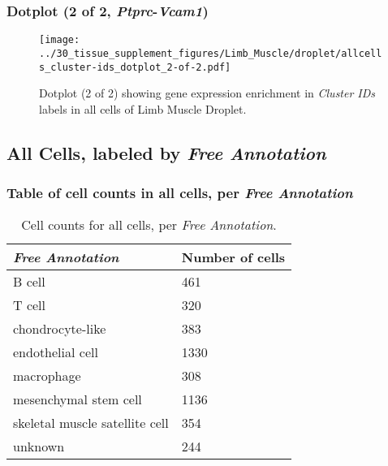 \clearpage

\subsubsection{Dotplot (2 of 2, \emph{Ptprc}-\emph{Vcam1})}
\begin{figure}[h]
\centering
\texttt{[image: ../30\_tissue\_supplement\_figures/Limb\_Muscle/droplet/allcells\_cluster-ids\_dotplot\_2-of-2.pdf]}

\caption{ Dotplot (2 of 2)  showing gene expression enrichment in \emph{Cluster IDs} labels in all cells of Limb Muscle Droplet. }
\end{figure}


\clearpage

\subsection{All Cells, labeled by \emph{Free Annotation}}
\subsubsection{Table of cell counts in all cells, per \emph{Free Annotation}}\begin{table}[h]
\centering
\label{my-label}
\begin{tabular}{@{}ll@{}}
\toprule

\emph{Free Annotation}& Number of cells \\ \midrule
B cell & 461 \\

T cell & 320 \\

chondrocyte-like & 383 \\

endothelial cell & 1330 \\

macrophage & 308 \\

mesenchymal stem cell & 1136 \\

skeletal muscle satellite cell & 354 \\

unknown & 244 \\
\bottomrule
\end{tabular}
\caption{Cell counts for all cells, per \emph{Free Annotation}.}
\end{table}

\clearpage
